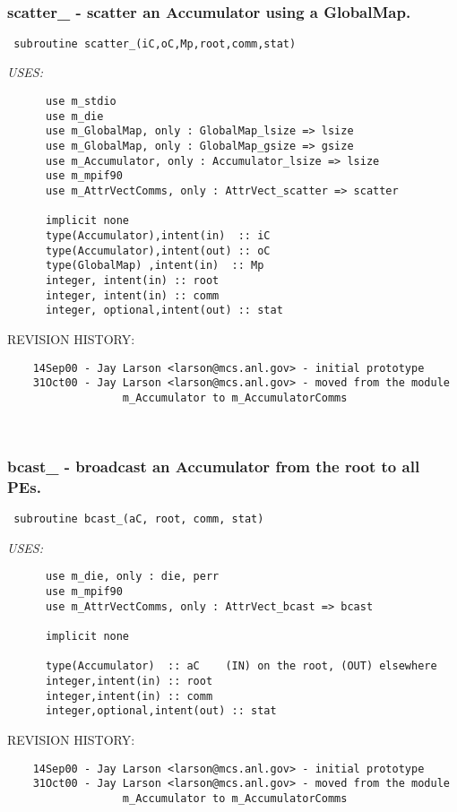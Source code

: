  
\mbox{}\hrulefill\ 
 

 \subsubsection{scatter\_ - scatter an Accumulator using a GlobalMap.}


 
 
\begin{verbatim} 
 subroutine scatter_(iC,oC,Mp,root,comm,stat)\end{verbatim}{\em USES:}
\begin{verbatim}      use m_stdio
      use m_die
      use m_GlobalMap, only : GlobalMap_lsize => lsize
      use m_GlobalMap, only : GlobalMap_gsize => gsize
      use m_Accumulator, only : Accumulator_lsize => lsize
      use m_mpif90
      use m_AttrVectComms, only : AttrVect_scatter => scatter
 
      implicit none
      type(Accumulator),intent(in)  :: iC
      type(Accumulator),intent(out) :: oC
      type(GlobalMap) ,intent(in)  :: Mp
      integer, intent(in) :: root
      integer, intent(in) :: comm
      integer, optional,intent(out) :: stat
 \end{verbatim}{\sf REVISION HISTORY:}
\begin{verbatim}  	14Sep00 - Jay Larson <larson@mcs.anl.gov> - initial prototype
  	31Oct00 - Jay Larson <larson@mcs.anl.gov> - moved from the module
                  m_Accumulator to m_AccumulatorComms\end{verbatim}
 
 
\mbox{}\hrulefill\ 
 

 \subsubsection{bcast\_ - broadcast an Accumulator from the root to all PEs.}


 
 
\begin{verbatim} 
 subroutine bcast_(aC, root, comm, stat)\end{verbatim}{\em USES:}
\begin{verbatim}      use m_die, only : die, perr
      use m_mpif90
      use m_AttrVectComms, only : AttrVect_bcast => bcast
 
      implicit none
 
      type(Accumulator)  :: aC	  (IN) on the root, (OUT) elsewhere
      integer,intent(in) :: root
      integer,intent(in) :: comm
      integer,optional,intent(out) :: stat
 \end{verbatim}{\sf REVISION HISTORY:}
\begin{verbatim}  	14Sep00 - Jay Larson <larson@mcs.anl.gov> - initial prototype
  	31Oct00 - Jay Larson <larson@mcs.anl.gov> - moved from the module
                  m_Accumulator to m_AccumulatorComms\end{verbatim}

